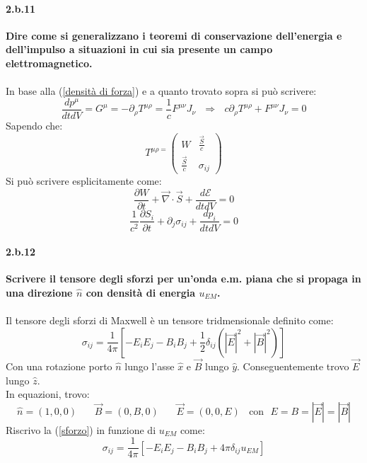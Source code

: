 \documentclass[twoside]{article}
\begin{document}
\paragraph{2.b.11}\textbf{Dire come si generalizzano i teoremi di conservazione dell'energia e dell'impulso
a situazioni in cui sia presente un campo elettromagnetico.}\\ \\
In base alla (\ref{densità di forza}) e a quanto trovato sopra si può scrivere:
\begin{equation}
    \frac{dp^\mu}{dtdV}=G^{\mu}=-\partial_{\rho}T^{\mu \rho}=\frac{1}{c}F^{\mu \nu} J_{\nu} \ \ \ \Rightarrow \ \ \ c\partial_{\rho}T^{\mu \rho}+F^{\mu \nu}J_{\nu}=0
\end{equation}
Sapendo che:
\begin{equation}
    T^{\mu\rho=}\begin{pmatrix}
    W & \frac{\vec{S}}{c}\\  \frac{\vec{S}}{c} & \sigma_{ij}
    \end{pmatrix}
\end{equation}
Si può scrivere esplicitamente come:
\begin{equation}
    \frac{\partial W}{\partial t}+\vec{\nabla}\cdot \vec{S}+\frac{d\mathcal{E}}{dtdV}=0
\end{equation}
\begin{equation}
    \frac{1}{c^2}\frac{\partial S_i}{\partial t}+\partial_j\sigma_{ij}+\frac{dp_i}{dtdV}=0
\end{equation} 



\paragraph{2.b.12}\textbf{Scrivere il tensore degli sforzi per un’onda e.m. piana che si propaga in una
direzione $\hat{n}$ con densità di energia $u_{EM}$.}\\ \\
Il tensore degli sforzi di Maxwell è un tensore tridmensionale definito come:
\begin{equation}\label{sforzo}
    \sigma_{ij}=\frac{1}{4\pi}\left[ -E_iE_j - B_i B_j +\frac{1}{2}\delta_{ij} (|\vec{E}|^2+|\vec{B}|^2) \right]
\end{equation}
Con una rotazione porto $\hat{n}$ lungo l'asse $\hat{x}$ e $\vec{B}$ lungo $\hat{y}$. Conseguentemente trovo $\vec{E}$ lungo $\hat{z}$.
\\
In equazioni, trovo:
\begin{equation}\label{compo}
    \hat{n}=(1,0,0) \ \ \ \ \ \ \ \ \vec{B}=(0,B,0) \ \ \ \ \ \ \ \ \vec{E}=(0,0,E) \ \ \ \ \text{con} \ \ \ E=B=|\vec{E}|=|\vec{B}|
\end{equation}
Riscrivo la (\ref{sforzo}) in funzione di $u_{EM}$ come:
\begin{equation}
    \sigma_{ij}=\frac{1}{4\pi}\left[ -E_iE_j-B_iB_j+4\pi \delta_{ij}u_{EM} \right]
\end{equation}
\end{document}
